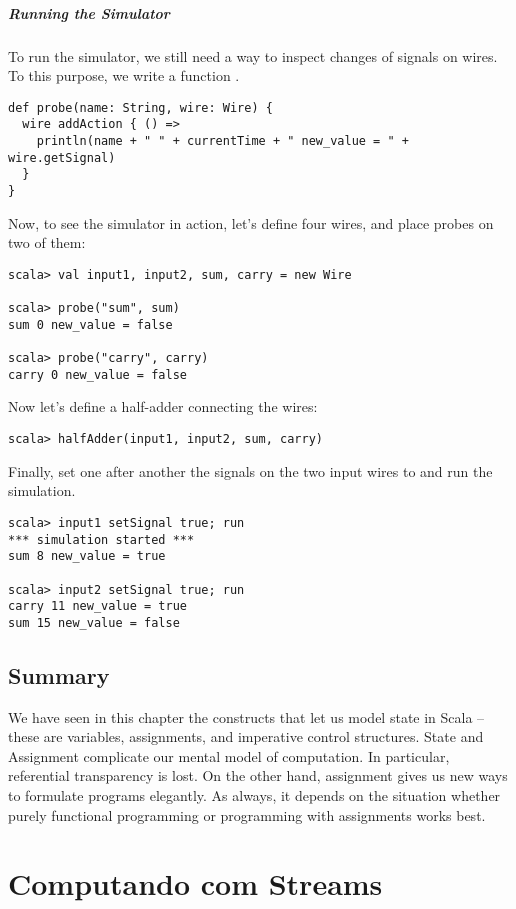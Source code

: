\paragraph{Running the Simulator}
To run the simulator, we still need a way to inspect changes of
signals on wires. To this purpose, we write a function .
\begin{lstlisting}
def probe(name: String, wire: Wire) {
  wire addAction { () =>
    println(name + " " + currentTime + " new_value = " + wire.getSignal)
  }
}
\end{lstlisting}
Now, to see the simulator in action, let's define four wires, and place
probes on two of them: 
\begin{lstlisting}
scala> val input1, input2, sum, carry = new Wire

scala> probe("sum", sum)
sum 0 new_value = false

scala> probe("carry", carry)
carry 0 new_value = false
\end{lstlisting}
Now let's define a half-adder connecting the wires:
\begin{lstlisting}
scala> halfAdder(input1, input2, sum, carry)
\end{lstlisting}
Finally, set one after another the signals on the two input wires to
 and run the simulation.
\begin{lstlisting}
scala> input1 setSignal true; run
*** simulation started ***
sum 8 new_value = true

scala> input2 setSignal true; run
carry 11 new_value = true
sum 15 new_value = false
\end{lstlisting}

\section{Summary}

We have seen in this chapter the constructs that let us model state in
Scala -- these are variables, assignments, and imperative control
structures.  State and Assignment complicate our mental model of
computation.  In particular, referential transparency is lost.  On the
other hand, assignment gives us new ways to formulate programs
elegantly. As always, it depends on the situation whether purely
functional programming or programming with assignments works best.

\chapter{Computando com Streams}

